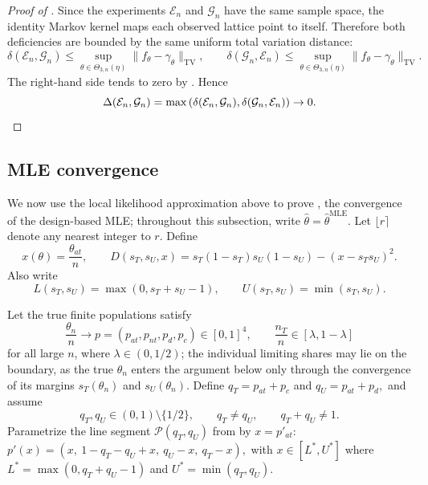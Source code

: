 \documentclass[12pt,reqno]{amsart}
\theoremstyle{theorem}
\theoremstyle{definition}
\newcommand{\0}{\mathbf{0}}
\newcommand{\1}{\mathbf{1}}
\begin{document}
\begin{proof}[Proof of ]
Since the experiments \(\mathcal E_n\) and \(\mathcal G_n\) have the same sample space, the identity Markov kernel
maps each observed lattice point to itself.  Therefore both deficiencies are
bounded by the same uniform total variation distance:
\[
\delta(\mathcal E_n,\mathcal G_n)
\le
\sup_{\theta\in\Theta_{3,n}(\eta)}
\|f_\theta-\gamma_\theta\|_{\mathrm{TV}},
\qquad
\delta(\mathcal G_n,\mathcal E_n)
\le
\sup_{\theta\in\Theta_{3,n}(\eta)}
\|f_\theta-\gamma_\theta\|_{\mathrm{TV}}.
\]
The right-hand side tends to zero by .  Hence
\[
\Delta(\mathcal E_n,\mathcal G_n)
=
\max\left(\delta(\mathcal E_n,\mathcal G_n),
\delta(\mathcal G_n,\mathcal E_n)\right)
\to0.
\qedhere
\]
\end{proof}

\subsection{MLE convergence}
\label{sec:mleconv}

We now use the local likelihood approximation above to prove , the convergence of
the design-based MLE; throughout this subsection, write \(\hat\theta = \hat{\theta}^{\text{MLE}}\).
Let \(\lfloor r\rceil\) denote any nearest integer to \(r\).  Define
\[
x(\theta)=\frac{\theta_{at}}n,\qquad
D(s_T,s_U,x)
=s_T(1-s_T)s_U(1-s_U)-(x-s_Ts_U)^2.
\]
Also write
\[
L(s_T,s_U)=\max(0,s_T+s_U-1),
\qquad
U(s_T,s_U)=\min(s_T,s_U).
\]

Let the true finite populations satisfy
\[
\frac{\theta_n}{n}\to
p=(p_{at},p_{nt},p_d,p_c)\in[0,1]^4,
\qquad
\frac{n_T}{n}\in[\lambda,1-\lambda]
\]
for all large \(n\), where \(\lambda\in(0,1/2)\); the individual limiting shares may lie on the boundary, as the true \(\theta_n\) enters the argument below only through the convergence of its margins \(s_T(\theta_n)\) and \(s_U(\theta_n)\).  Define
$
q_T=p_{at}+p_c$ and $q_U=p_{at}+p_d,
$
and assume
\[
q_T,q_U\in(0,1)\setminus\{1/2\},\qquad
q_T\ne q_U,\qquad q_T+q_U\ne1. \tag{A}\label{ass:mle-A}
\]
Parametrize the line segment \(\mathcal{P}(q_T,q_U)\) from  by \(x=p'_{at}\):
$
p'(x)=
\left(x,\ 1-q_T-q_U+x,\ q_U-x,\ q_T-x\right),
$
with
$x \in [L^*, U^*]$
where
$
L^*=\max(0,q_T+q_U-1)$ and
$U^*=\min(q_T,q_U).$
\end{document}
